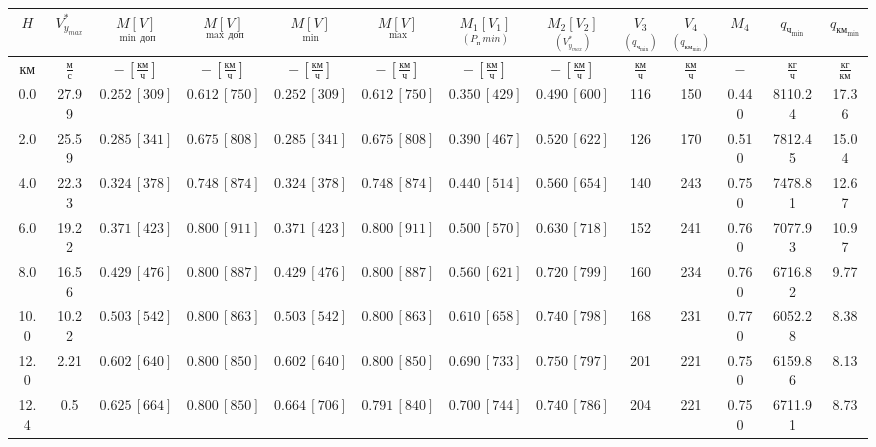 \begin{tabular}{|c|c|c|c|c|c|c|c|c|c|c|c|c|}
\hline
$H$ & $V_{y_{max}}^*$ & $\underset{\min \, доп}{M [V]}$ & $\underset{\max \, доп}{M [V]}$ & $\underset{\min}{M [V]}$ & $\underset{\max}{M [V]}$ & $\underset{(P_п\, min)}{M_1 [V_1]}$ & $\underset{(V_{y_{max}}^*)}{M_2 [V_2]}$ & $\underset{(q_{ч_{\min}})}{V_3}$ & $\underset{(q_{{км}_{\min}})}{V_4}$ & $M_4$ & $q_{ч_{\min}}$ & $q_{{км}_{\min}}$ \\ 
\hline
$км$ & $\frac{м}{с}$ & $-\,[\frac{км}{ч}]$ & $-\,[\frac{км}{ч}]$ & $-\,[\frac{км}{ч}]$ & $-\,[\frac{км}{ч}]$ & $-\,[\frac{км}{ч}]$ & $-\,[\frac{км}{ч}]$ & $\frac{км}{ч}$ & $\frac{км}{ч}$ & $-$ & $\frac{кг}{ч}$ & $\frac{кг}{км}$ \\ 
\hline
0.0 & 27.99 & $0.252\, [309]$ & $0.612\, [750]$ & $0.252\, [309]$ & $0.612\, [750]$ & $0.350\, [429]$ & $0.490\, [600]$ & 116 & 150 & 0.440 & 8110.24 & 17.36 \\ 
\hline
2.0 & 25.59 & $0.285\, [341]$ & $0.675\, [808]$ & $0.285\, [341]$ & $0.675\, [808]$ & $0.390\, [467]$ & $0.520\, [622]$ & 126 & 170 & 0.510 & 7812.45 & 15.04 \\ 
\hline
4.0 & 22.33 & $0.324\, [378]$ & $0.748\, [874]$ & $0.324\, [378]$ & $0.748\, [874]$ & $0.440\, [514]$ & $0.560\, [654]$ & 140 & 243 & 0.750 & 7478.81 & 12.67 \\ 
\hline
6.0 & 19.22 & $0.371\, [423]$ & $0.800\, [911]$ & $0.371\, [423]$ & $0.800\, [911]$ & $0.500\, [570]$ & $0.630\, [718]$ & 152 & 241 & 0.760 & 7077.93 & 10.97 \\ 
\hline
8.0 & 16.56 & $0.429\, [476]$ & $0.800\, [887]$ & $0.429\, [476]$ & $0.800\, [887]$ & $0.560\, [621]$ & $0.720\, [799]$ & 160 & 234 & 0.760 & 6716.82 & 9.77 \\ 
\hline
10.0 & 10.22 & $0.503\, [542]$ & $0.800\, [863]$ & $0.503\, [542]$ & $0.800\, [863]$ & $0.610\, [658]$ & $0.740\, [798]$ & 168 & 231 & 0.770 & 6052.28 & 8.38 \\ 
\hline
12.0 & 2.21 & $0.602\, [640]$ & $0.800\, [850]$ & $0.602\, [640]$ & $0.800\, [850]$ & $0.690\, [733]$ & $0.750\, [797]$ & 201 & 221 & 0.750 & 6159.86 & 8.13 \\ 
\hline
12.4 & 0.5 & $0.625\, [664]$ & $0.800\, [850]$ & $0.664\, [706]$ & $0.791\, [840]$ & $0.700\, [744]$ & $0.740\, [786]$ & 204 & 221 & 0.750 & 6711.91 & 8.73 \\ 
\hline
\end{tabular}